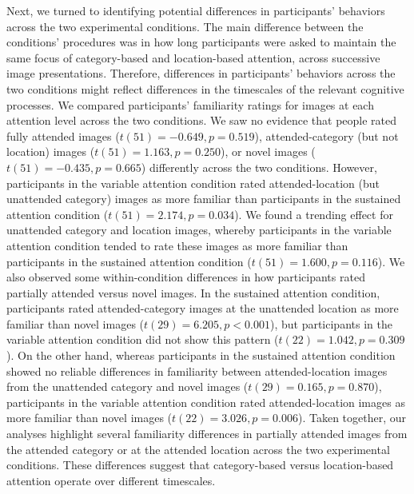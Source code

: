 \documentclass[english]{article}
\begin{document}
Next, we turned to identifying potential differences in participants' behaviors
across the two experimental conditions. The main difference between the
conditions' procedures was in how long participants were asked to maintain the
same focus of category-based and location-based attention, across successive
image presentations. Therefore, differences in participants' behaviors across
the two conditions might reflect differences in the timescales of the relevant
cognitive processes. We compared participants' familiarity ratings for images
at each attention level across the two conditions. We saw no evidence that
people rated fully attended images ($t(51) = -0.649, p = 0.519$),
attended-category (but not location) images ($t(51) = 1.163, p = 0.250$), or
novel images ($t(51) = -0.435, p = 0.665$) differently across the two
conditions. However, participants in the variable attention condition rated
attended-location (but unattended category) images as more familiar than
participants in the sustained attention condition ($t(51) = 2.174, p = 0.034$).
We found a trending effect for unattended category and location images, whereby
participants in the variable attention condition tended to rate these images as
more familiar than participants in the sustained attention condition ($t(51) =
1.600, p = 0.116$). We also observed some within-condition differences in how
participants rated partially attended versus novel images. In the sustained
attention condition, participants rated attended-category images at the
unattended location as more familiar than novel images ($t(29) = 6.205, p <
0.001$), but participants in the variable attention condition did not show this
pattern ($t(22) = 1.042, p = 0.309$). On the other hand, whereas participants
in the sustained attention condition showed no reliable differences in
familiarity between attended-location images from the unattended category and
novel images ($t(29) = 0.165, p = 0.870$), participants in the variable
attention condition rated attended-location images as more familiar than novel
images ($t(22) = 3.026, p = 0.006$). Taken together, our analyses highlight
several familiarity differences in partially attended images from the attended
category or at the attended location across the two experimental conditions.
These differences suggest that category-based versus location-based attention
operate over different timescales.
\end{document}
